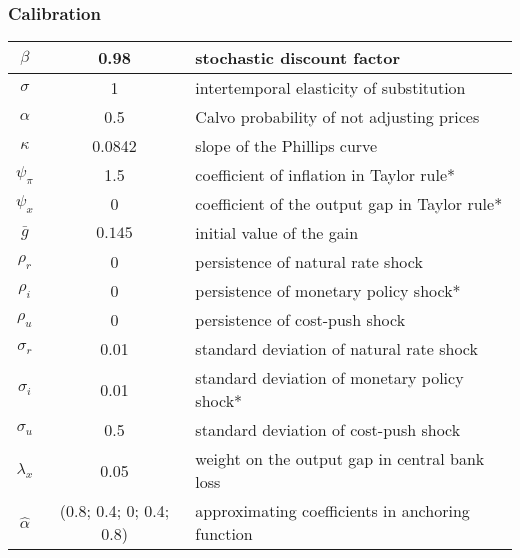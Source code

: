 \documentclass[10pt]{beamer}
\begin{document}
\begin{frame}
	\frametitle{Calibration}

\begin{center}
\begin{table}
\begin{tabular}{ c | c  | l }
 $\beta$ & 0.98 & stochastic discount factor \\  \hline
 $\sigma$ & 1  & intertemporal elasticity of substitution \\  \hline
 $\alpha$ & 0.5 &  Calvo probability of not adjusting prices \\\hline
 $\kappa$ & 0.0842 &  slope of the Phillips curve \\\hline
 $\psi_{\pi} $& 1.5  & coefficient of inflation in Taylor rule*\\\hline
 $\psi_x$ & 0   & coefficient of the output gap in Taylor rule*  \\\hline %
 $\bar{g}$ & $0.145$  & initial value of the gain \\\hline %
    $\rho_r$ & 0 &   persistence of natural rate shock \\ \hline %
    $\rho_i$ & 0 &  persistence of monetary policy shock*  \\ \hline
    $\rho_u$ & 0  &  persistence of cost-push shock  \\ \hline
    $\sigma_r$ & 0.01 & standard deviation of natural rate shock  \\ \hline
    $\sigma_i$ &  0.01  &standard deviation of monetary policy shock*  \\ \hline %
    $\sigma_u$ & 0.5 & standard deviation of cost-push shock   \\ \hline  
    $\lambda_x$ & 0.05 & weight on the output gap in central bank loss   \\ \hline  %
    $\hat{\alpha}$ & (0.8; 0.4; 0; 0.4; 0.8) & approximating coefficients in anchoring function \\ \hline   
\end{tabular}     
       \label{calibration}
 \end{table}
\end{center}
\end{frame}
\end{document}
